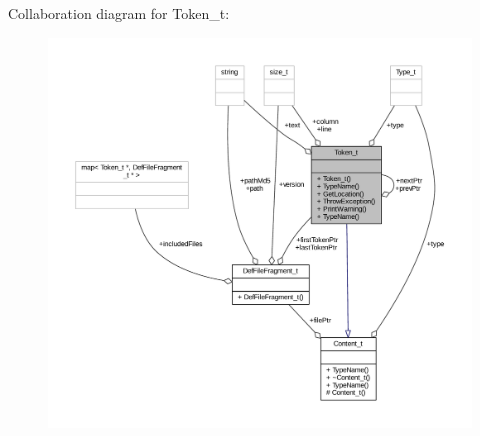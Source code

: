 Collaboration diagram for Token\+\_\+t\+:
\nopagebreak
\begin{figure}[H]
\begin{center}
\leavevmode
\includegraphics[width=350pt]{struct_token__t__coll__graph}
\end{center}
\end{figure}
